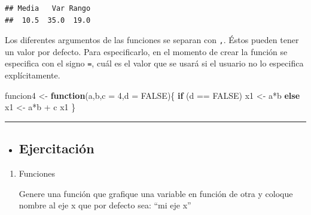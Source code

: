 \documentclass[
]{book}
\newenvironment{Shaded}{\begin{snugshade}}{\end{snugshade}}
\newcommand{\AttributeTok}[1]{\textcolor[rgb]{0.77,0.63,0.00}{#1}}
\newcommand{\ConstantTok}[1]{\textcolor[rgb]{0.00,0.00,0.00}{#1}}
\newcommand{\ControlFlowTok}[1]{\textcolor[rgb]{0.13,0.29,0.53}{\textbf{#1}}}
\newcommand{\DecValTok}[1]{\textcolor[rgb]{0.00,0.00,0.81}{#1}}
\newcommand{\NormalTok}[1]{#1}
\newcommand{\OtherTok}[1]{\textcolor[rgb]{0.56,0.35,0.01}{#1}}
\newcommand{\SpecialCharTok}[1]{\textcolor[rgb]{0.00,0.00,0.00}{#1}}
\newenvironment{rmdblock}[1]
{\begin{shaded*}
		\begin{itemize}
			\renewcommand{\labelitemi}{
				\raisebox{-.7\height}[0pt][0pt]{
					{\setkeys{Gin}{width=3em,keepaspectratio}\texttt{[image: images/\#1]}}
				}
			}
			\item
		}
		{
		\end{itemize}
	\end{shaded*}
}
\newenvironment{rmdtip}
{\begin{rmdblock}{tip}}
	{\end{rmdblock}}
\begin{document}
\begin{verbatim}
## Media   Var Rango 
##  10.5  35.0  19.0
\end{verbatim}

Los diferentes argumentos de las funciones se separan con \texttt{,}. Éstos pueden tener un valor por defecto. Para especificarlo, en el momento de crear la función se especifica con el signo \texttt{=}, cuál es el valor que se usará si el usuario no lo especifica explícitamente.

\begin{Shaded}
\begin{Highlighting}[]
\NormalTok{funcion4 }\OtherTok{\textless{}{-}} \ControlFlowTok{function}\NormalTok{(a,b,}\AttributeTok{c =} \DecValTok{4}\NormalTok{,}\AttributeTok{d =} \ConstantTok{FALSE}\NormalTok{)\{}
  \ControlFlowTok{if}\NormalTok{ (d }\SpecialCharTok{==} \ConstantTok{FALSE}\NormalTok{) x1 }\OtherTok{\textless{}{-}}\NormalTok{ a}\SpecialCharTok{*}\NormalTok{b }\ControlFlowTok{else}\NormalTok{ x1 }\OtherTok{\textless{}{-}}\NormalTok{ a}\SpecialCharTok{*}\NormalTok{b }\SpecialCharTok{+}\NormalTok{ c}
\NormalTok{  x1}
\NormalTok{\}}
\end{Highlighting}
\end{Shaded}

\begin{center}\rule{0.5\linewidth}{0.5pt}\end{center}

\begin{rmdtip}
\hypertarget{ejercitaciuxf3n}{%
\subsection{Ejercitación}\label{ejercitaciuxf3n}}
\end{rmdtip}

\begin{enumerate}
\def\labelenumi{\arabic{enumi}.}
\item
  Funciones

  Genere una función que grafique una variable en función de otra y coloque nombre al eje x que por defecto sea: ``mi eje x''
\end{enumerate}

  
\end{document}
